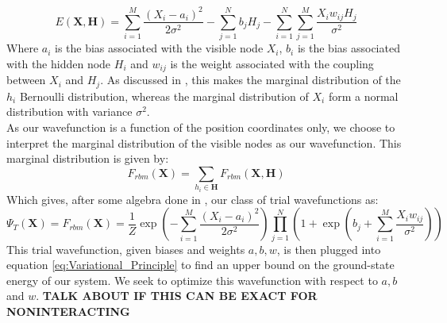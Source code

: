 \documentclass[a4paper, 10pt]{article}
\begin{document}
	\begin{equation}
	E(\mathbf{X}, \mathbf{H})=\sum_{i=1}^{M}\frac{\left(X_i-a_i\right)^2}{2\sigma^2}-\sum_{j=1}^N b_j H_j -\sum_{i=1}^{N}\sum_{j=1}^{M}\frac{X_iw_{ij}H_j}{\sigma^2}
	\end{equation}
	Where $a_i$ is the bias associated with the visible node $X_i$, $b_i$ is the bias associated with the hidden node $H_i$ and $w_{ij}$ is the weight associated with the coupling between $X_i$ and $H_j$. As discussed in \cite{Wang2014}, this makes the marginal distribution of the $h_i$ Bernoulli distribution, whereas the marginal distribution of $X_i$ form a normal distribution with variance $\sigma^2$.\\
	\linebreak
	As our wavefunction is a function of the position coordinates only, we choose to interpret the marginal distribution of the visible nodes as our wavefunction. This marginal distribution is given by:
	\begin{equation}
	F_{rbm}(\mathbf{X})=\sum_{h_i \in \mathbf{H}}F_{rbm}(\mathbf{X}, \mathbf{H})
	\end{equation}
	Which gives, after some algebra done in \cite{Hjorth-Jensen2018}, our class of trial wavefunctions as:
	\begin{equation}\label{eq:Wavefunction}
	\Psi_T(\mathbf{X})=F_{rbm}(\mathbf{X})=\frac{1}{Z}\exp \left(-\sum_{i=1}^M \frac{(X_i-a_i)^2}{2\sigma^2}\right)\prod_{j=1}^{N}\left(1+\exp\left(b_j+\sum_{i=1}^M \frac{X_iw_{ij}}{\sigma^2} \right)\right)
	\end{equation}
	This trial wavefunction, given biases and weights $a,b,w$, is then plugged into equation \ref{eq:Variational_Principle} to find an upper bound on the ground-state energy of our system. We seek to optimize this wavefunction with respect to $a,b$ and $w$.
	\textbf{TALK ABOUT IF THIS CAN BE EXACT FOR NONINTERACTING}
\end{document}
